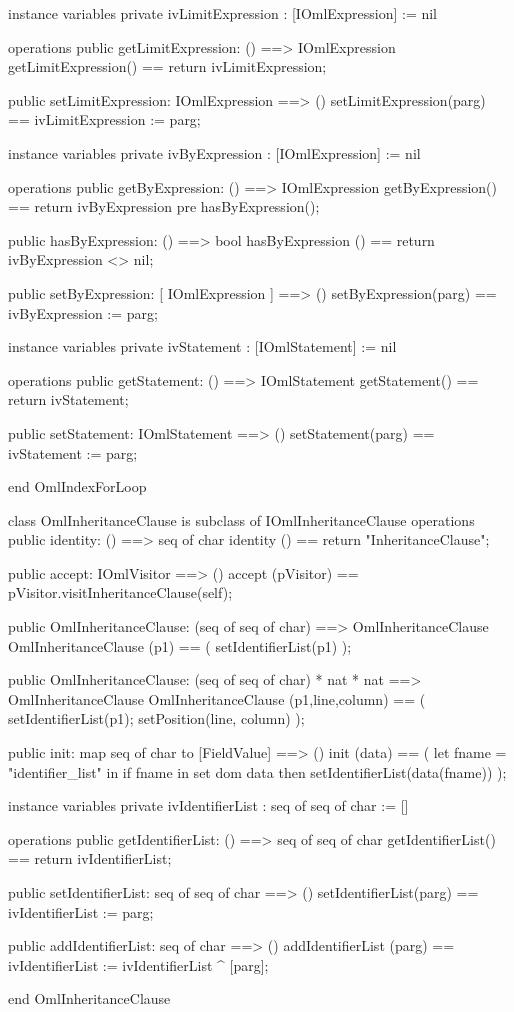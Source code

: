 \begin{vdm_al}
instance variables
  private ivLimitExpression : [IOmlExpression] := nil

operations
  public getLimitExpression: () ==> IOmlExpression
  getLimitExpression() == return ivLimitExpression;

  public setLimitExpression: IOmlExpression ==> ()
  setLimitExpression(parg) == ivLimitExpression := parg;

instance variables
  private ivByExpression : [IOmlExpression] := nil

operations
  public getByExpression: () ==> IOmlExpression
  getByExpression() == return ivByExpression
    pre hasByExpression();

  public hasByExpression: () ==> bool
  hasByExpression () == return ivByExpression <> nil;

  public setByExpression: [ IOmlExpression ] ==> ()
  setByExpression(parg) == ivByExpression := parg;

instance variables
  private ivStatement : [IOmlStatement] := nil

operations
  public getStatement: () ==> IOmlStatement
  getStatement() == return ivStatement;

  public setStatement: IOmlStatement ==> ()
  setStatement(parg) == ivStatement := parg;

end OmlIndexForLoop
\end{vdm_al}

\begin{vdm_al}
class OmlInheritanceClause is subclass of IOmlInheritanceClause
operations
  public identity: () ==> seq of char
  identity () == return "InheritanceClause";

  public accept: IOmlVisitor ==> ()
  accept (pVisitor) == pVisitor.visitInheritanceClause(self);

  public OmlInheritanceClause:
    (seq of seq of char) ==> OmlInheritanceClause
  OmlInheritanceClause (p1) == 
    ( setIdentifierList(p1) );

  public OmlInheritanceClause:
    (seq of seq of char) *
    nat *
    nat ==> OmlInheritanceClause
  OmlInheritanceClause (p1,line,column) == 
    ( setIdentifierList(p1);
      setPosition(line, column) );

  public init: map seq of char to [FieldValue] ==> ()
  init (data) ==
    ( let fname = "identifier_list" in
        if fname in set dom data
        then setIdentifierList(data(fname)) );

instance variables
  private ivIdentifierList : seq of seq of char := []

operations
  public getIdentifierList: () ==> seq of seq of char
  getIdentifierList() == return ivIdentifierList;

  public setIdentifierList: seq of seq of char ==> ()
  setIdentifierList(parg) == ivIdentifierList := parg;

  public addIdentifierList: seq of char ==> ()
  addIdentifierList (parg) == ivIdentifierList := ivIdentifierList ^ [parg];

end OmlInheritanceClause
\end{vdm_al}

